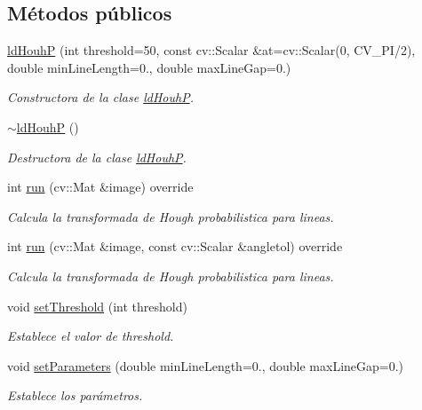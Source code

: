 \subsection*{Métodos públicos}
\begin{DoxyCompactItemize}
\item 
\hyperlink{class_i3_d_1_1ld_houh_p_af281fdf68e939e11d7b26238e5448535}{ld\+HouhP} (int threshold=50, const cv\+::\+Scalar \&at=cv\+::\+Scalar(0, C\+V\+\_\+\+PI/2), double min\+Line\+Length=0., double max\+Line\+Gap=0.)
\begin{DoxyCompactList}\small\item\em Constructora de la clase \hyperlink{class_i3_d_1_1ld_houh_p}{ld\+HouhP}. \end{DoxyCompactList}\item 
\hyperlink{class_i3_d_1_1ld_houh_p_a591bddef725072413c1eb3a490fb4bcf}{$\sim$ld\+HouhP} ()
\begin{DoxyCompactList}\small\item\em Destructora de la clase \hyperlink{class_i3_d_1_1ld_houh_p}{ld\+HouhP}. \end{DoxyCompactList}\item 
int \hyperlink{class_i3_d_1_1ld_houh_p_a91b42a50eb80dfcb9f5cf1bdf0d8c908}{run} (cv\+::\+Mat \&image) override
\begin{DoxyCompactList}\small\item\em Calcula la transformada de Hough probabilistica para lineas. \end{DoxyCompactList}\item 
int \hyperlink{class_i3_d_1_1ld_houh_p_ad00dcfc80128ea426b2fff2878c7e723}{run} (cv\+::\+Mat \&image, const cv\+::\+Scalar \&angletol) override
\begin{DoxyCompactList}\small\item\em Calcula la transformada de Hough probabilistica para lineas. \end{DoxyCompactList}\item 
void \hyperlink{class_i3_d_1_1ld_houh_p_a782e9ee0c5448b23e545893bf1ab564e}{set\+Threshold} (int threshold)
\begin{DoxyCompactList}\small\item\em Establece el valor de threshold. \end{DoxyCompactList}\item 
void \hyperlink{class_i3_d_1_1ld_houh_p_a0e5b764154bd17ec13d20194dedc3df4}{set\+Parameters} (double min\+Line\+Length=0., double max\+Line\+Gap=0.)
\begin{DoxyCompactList}\small\item\em Establece los parámetros. \end{DoxyCompactList}\end{DoxyCompactItemize}
